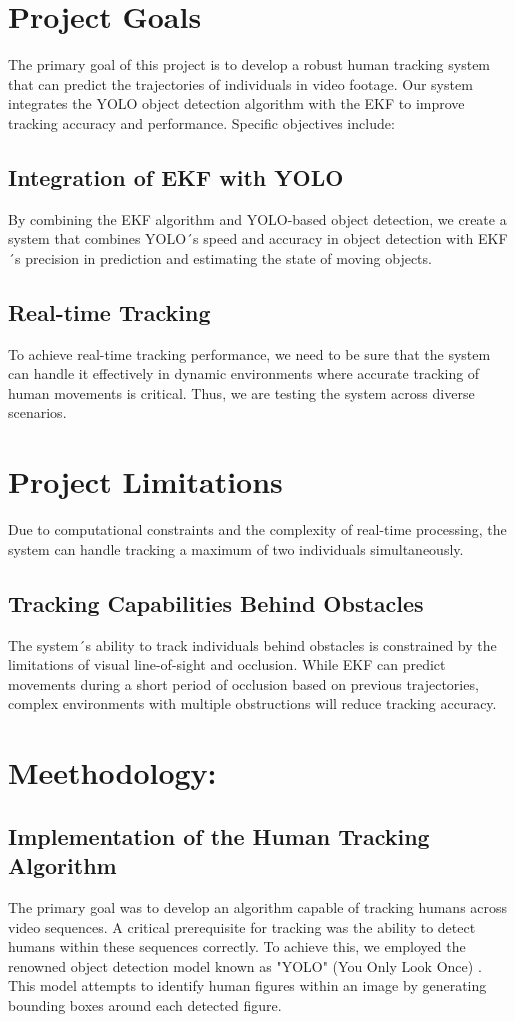 \documentclass{article}
\begin{document}
\section{Project Goals}
The primary goal of this project is to develop a robust human tracking system that can predict the trajectories of individuals in video footage. Our system integrates the YOLO object detection algorithm with the EKF to improve tracking accuracy and performance. Specific objectives include:
\subsection{Integration of EKF with YOLO}
By combining the EKF algorithm and YOLO-based object detection, we create a system that combines YOLO´s speed and accuracy in object detection with EKF´s precision in prediction and estimating the state of moving objects.
\subsection{Real-time Tracking}
To achieve real-time tracking performance, we need to be sure that the system can handle it effectively in dynamic environments where accurate tracking of human movements is critical. Thus, we are testing the system across diverse scenarios. 

\section{Project Limitations}
Due to computational constraints and the complexity of real-time processing, the system can handle tracking a maximum of two individuals simultaneously.

\subsection{Tracking Capabilities Behind Obstacles}
The system´s ability to track individuals behind obstacles is constrained by the limitations of visual line-of-sight and occlusion. While EKF can predict movements during a short period of occlusion based on previous trajectories, complex environments with multiple obstructions will reduce tracking accuracy.\\


\section{Meethodology:}
\subsection{Implementation of the Human Tracking Algorithm}
The primary goal was to develop an algorithm capable of tracking humans across video sequences. A critical prerequisite for tracking was the ability to detect humans within these sequences correctly. To achieve this, we employed the renowned object detection model known as "YOLO" (You Only Look Once) \cite{learnopencvYOLOv8Tracking}. This model attempts to identify human figures within an image by generating bounding boxes around each detected figure.
\end{document}
